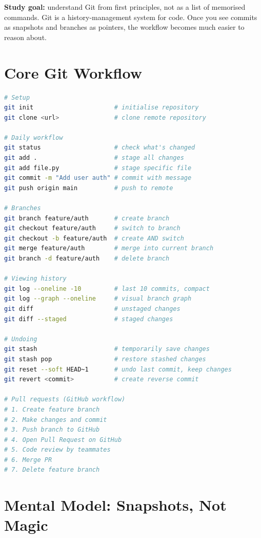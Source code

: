\documentclass[12pt, a4paper, oneside]{book}
\begin{document}
\begin{studybox}
\textbf{Study goal:} understand Git from first principles, not as a list of memorised commands. Git is a history-management system for code. Once you see commits as snapshots and branches as pointers, the workflow becomes much easier to reason about.
\end{studybox}

\section{Core Git Workflow}

\begin{lstlisting}[language=bash, caption={Essential Git commands}]
# Setup
git init                      # initialise repository
git clone <url>               # clone remote repository

# Daily workflow
git status                    # check what's changed
git add .                     # stage all changes
git add file.py               # stage specific file
git commit -m "Add user auth" # commit with message
git push origin main          # push to remote

# Branches
git branch feature/auth       # create branch
git checkout feature/auth     # switch to branch
git checkout -b feature/auth  # create AND switch
git merge feature/auth        # merge into current branch
git branch -d feature/auth    # delete branch

# Viewing history
git log --oneline -10         # last 10 commits, compact
git log --graph --oneline     # visual branch graph
git diff                      # unstaged changes
git diff --staged             # staged changes

# Undoing
git stash                     # temporarily save changes
git stash pop                 # restore stashed changes
git reset --soft HEAD~1       # undo last commit, keep changes
git revert <commit>           # create reverse commit

# Pull requests (GitHub workflow)
# 1. Create feature branch
# 2. Make changes and commit
# 3. Push branch to GitHub
# 4. Open Pull Request on GitHub
# 5. Code review by teammates
# 6. Merge PR
# 7. Delete feature branch
\end{lstlisting}

\section{Mental Model: Snapshots, Not Magic}
\end{document}
